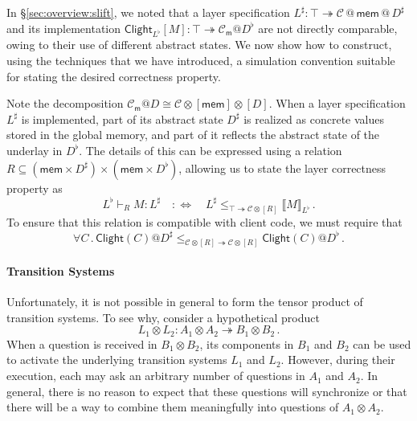 \documentclass[acmsmall,screen,review,anonymous]{acmart}
\newcommand{\kw}[1]{\ensuremath{ \mathsf{#1} }}
\begin{document}
\begin{example} \label{ex:overview:absrel} %
In \S\ref{sec:overview:slift},
we noted that a layer specification
$L^\sharp :
 \top \twoheadrightarrow \mathcal{C} \mathbin@ \kw{mem} \mathbin@ D^\sharp$
and its implementation
$\kw{Clight}_{L^\flat}[M] :
 \top \twoheadrightarrow \mathcal{C}_\kw{m}@D^\flat$
are not directly comparable, owing to their
use of different abstract states.
We now show how to construct,
using the techniques that we have introduced,
a simulation convention suitable for
stating the desired correctness property.

Note the decomposition
$\mathcal{C}_\kw{m}@D \cong \mathcal{C} \otimes [\kw{mem}] \otimes [D]$.
When a layer specification $L^\sharp$ is implemented,
part of its abstract state $D^\sharp$ is realized as concrete values
stored in the global memory,
and part of it reflects the abstract state of the underlay in $D^\flat$.
The details of this can be expressed using a relation
$R \subseteq (\kw{mem} \times D^\sharp) \times (\kw{mem} \times D^\flat)$,
allowing us to state the layer correctness property as
\[
  L^\flat \vdash_R M : L^\sharp \quad :\Leftrightarrow \quad
    L^\sharp \le_{\top \twoheadrightarrow \mathcal{C} \otimes [R]}
    \llbracket M \rrbracket_{L^\flat}
  \,.
\]
To ensure that this relation is compatible with client code,
we must require that
\[
  \forall C \mathbin.
    \kw{Clight}(C)@D^\sharp
    \le_{\mathcal{C} \otimes [R] \twoheadrightarrow \mathcal{C} \otimes [R]}
    \kw{Clight}(C)@D^\flat
  \,.
\]
\end{example}


\paragraph{Transition Systems} %

Unfortunately,
it is not possible in general
to form the tensor product of transition systems.
To see why, consider a hypothetical product
\[
  L_1 \otimes L_2 : A_1 \otimes A_2 \twoheadrightarrow B_1 \otimes B_2
  \,.
\]
When a question is received in $B_1 \otimes B_2$,
its components in $B_1$ and $B_2$ can be used to activate
the underlying transition systems $L_1$ and $L_2$.
However, during their execution,
each may ask
an arbitrary number of questions in $A_1$ and $A_2$.
In general,
there is no reason to expect that these questions
will synchronize or
that there will be a way to
combine them meaningfully
into questions of $A_1 \otimes A_2$.
\end{document}
